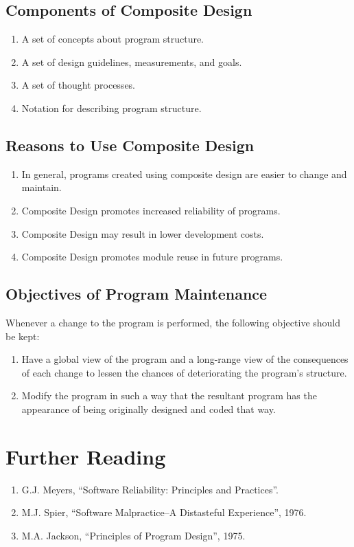 \documentclass{designdoc}
\begin{document}
\subsection{Components of Composite Design}
\begin{enumerate}
\item A set of concepts about program structure.
\item A set of design guidelines, measurements, and goals.
\item A set of thought processes.
\item Notation for describing program structure.
\end{enumerate}

\subsection{Reasons to Use Composite Design}
\begin{enumerate}
\item In general, programs created using composite design are easier to change
  and maintain.
\item Composite Design promotes increased reliability of programs.
\item Composite Design may result in lower development costs.
\item Composite Design promotes module reuse in future programs.
\end{enumerate}

\subsection{Objectives of Program Maintenance}
Whenever a change to the program is performed, the following objective should
be kept:
\begin{enumerate}
\item Have a global view of the program and a long-range view of the
  consequences of each change to lessen the chances of deteriorating the
  program's structure.
\item Modify the program in such a way that the resultant program has the
  appearance of being originally designed and coded that way.
\end{enumerate}

\section{Further Reading}
\begin{enumerate}
\item G.J. Meyers, ``Software Reliability: Principles and Practices''.
\item M.J. Spier, ``Software Malpractice--A Distasteful Experience'', 1976.
\item M.A. Jackson, ``Principles of Program Design'', 1975.  
\end{enumerate}
\end{document}
